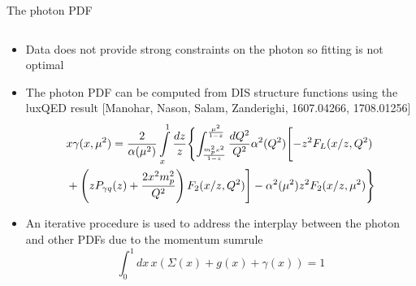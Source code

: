 \documentclass[8pt,t]{beamer}
\begin{document}
\begin{frame}{The photon PDF}
  \begin{columns}
    \begin{column}{0.59\textwidth}
      \begin{itemize}
        \item Data does not provide strong constraints on the photon so fitting is not optimal

        \item The photon PDF can be computed from DIS structure functions using the luxQED result {\color{gray}\footnotesize[Manohar, Nason, Salam, Zanderighi, 1607.04266, 1708.01256]}
        \begin{equation*}
          \begin{split}
            & x \gamma(x, \mu^2)
            =
            \frac{2}{\alpha (\mu^2)} \int\limits_x^1 \frac{dz}{z}
            \Biggl\{ \int_{m_p^2x^2 \over 1-z}^{\mu^2 \over 1-z} \frac{dQ^2}{Q^2}
            \alpha^2(Q^2) \Biggl[ -z^2 F_L(x/z, Q^2) \\
            & + \left( z P_{\gamma q}(z) + \frac{2 x^2 m_p^2}{Q^2} \right)
            F_2(x/z, Q^2)\Biggr] - \alpha^2(\mu^2) z^2 F_2(x/z, \mu^2)\Biggr\}
          \end{split}
        \end{equation*}

        \item An iterative procedure  is used to address the interplay between the photon and other PDFs due to the momentum sumrule
        \begin{equation*}
          \int_0^1 dx\, x \left( \Sigma(x) + g(x) + \gamma(x) \right) =1
        \end{equation*}
      \end{itemize}
    \end{column}


\end{columns}
\end{frame}
\end{document}
